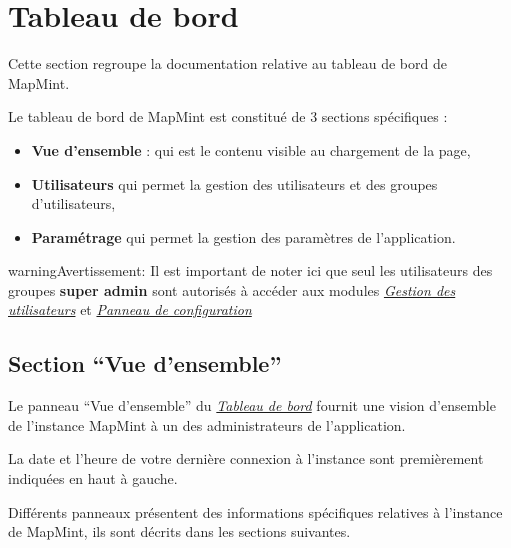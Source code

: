 \documentclass[letterpaper,10pt,french]{sphinxmanual}
\begin{document}
\chapter{Tableau de bord}
\label{dashboard/index:tableau-de-bord}\label{dashboard/index::doc}\label{dashboard/index:dashboard}
Cette section regroupe la documentation relative au tableau de bord de
MapMint.

Le tableau de bord de MapMint est constitué de 3 sections spécifiques
:
\begin{itemize}
\item {} 
\textbf{Vue d'ensemble} : qui est le contenu visible au chargement de la page,

\item {} 
\textbf{Utilisateurs} qui permet la gestion des utilisateurs et des groupes d'utilisateurs,

\item {} 
\textbf{Paramétrage}  qui permet la gestion des paramètres de l'application.

\end{itemize}

\begin{notice}{warning}{Avertissement:}
Il est important de noter ici que seul les utilisateurs des groupes
\textbf{super admin} sont autorisés à accéder aux modules
{\hyperref[dashboard/usersmanagement:dashboard-usersmanagement]{\emph{Gestion des utilisateurs}}} et  {\hyperref[dashboard/configuration:dashboard-configuration]{\emph{Panneau de configuration}}}
\end{notice}


\section{Section ``Vue d'ensemble''}
\label{dashboard/overview::doc}\label{dashboard/overview:section-vue-d-ensemble}\label{dashboard/overview:dashboard-overview}
Le panneau ``Vue d'ensemble'' du {\hyperref[dashboard/index::doc]{\emph{\emph{Tableau de bord}}}} fournit une
vision d'ensemble de l'instance MapMint à un des administrateurs de
l'application.

La date et l'heure de votre dernière connexion à l'instance sont
premièrement indiquées en haut à gauche.

Différents panneaux présentent des informations spécifiques relatives
à l'instance de MapMint, ils sont décrits dans les sections suivantes.
\end{document}
